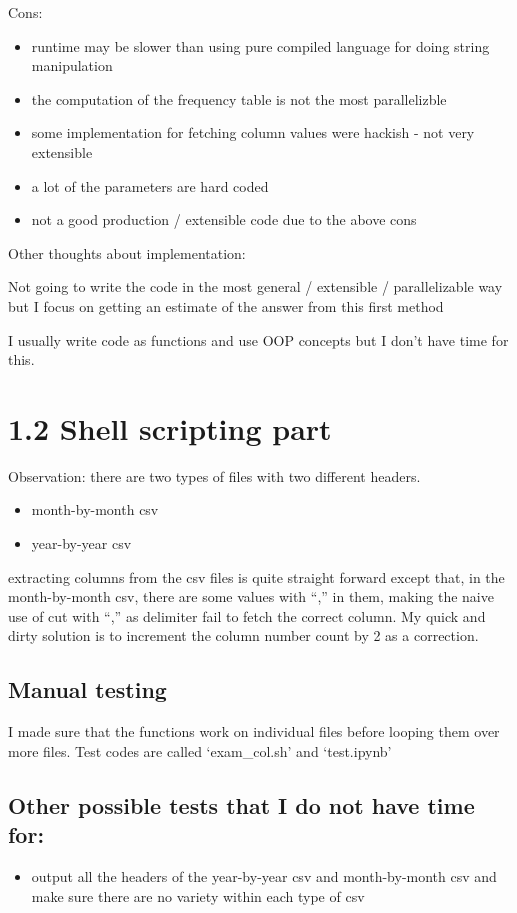 \documentclass[letterpaper,10pt,english]{/usr/local/lib/python2.7/dist-packages/sphinx/texinputs/sphinxhowto}
\begin{document}
Cons:

\begin{itemize}
\itemsep1pt\parskip0pt
\item
  runtime may be slower than using pure compiled language for doing
  string manipulation
\item
  the computation of the frequency table is not the most parallelizble
\item
  some implementation for fetching column values were hackish - not very
  extensible
\item
  a lot of the parameters are hard coded
\item
  not a good production / extensible code due to the above cons
\end{itemize}

Other thoughts about implementation:

Not going to write the code in the most general / extensible /
parallelizable way but I focus on getting an estimate of the answer from
this first method

I usually write code as functions and use OOP concepts but I don't have
time for this.\section{1.2 Shell scripting part}Observation: there are two types of files with two different headers.

\begin{itemize}
\itemsep1pt\parskip0pt
\item
  month-by-month csv\\
\item
  year-by-year csv
\end{itemize}extracting columns from the csv files is quite straight forward except
that, in the month-by-month csv, there are some values with ``,'' in
them, making the naive use of cut with ``,'' as delimiter fail to fetch
the correct column. My quick and dirty solution is to increment the
column number count by 2 as a correction.\subsection{Manual testing}I made sure that the functions work on individual files before looping
them over more files. Test codes are called `exam\_col.sh' and
`test.ipynb'\subsection{Other possible tests that I do not have time for:}\begin{itemize}
\itemsep1pt\parskip0pt
\item
  output all the headers of the year-by-year csv and month-by-month csv
  and make sure there are no variety within each type of csv
\end{itemize}
\end{document}
